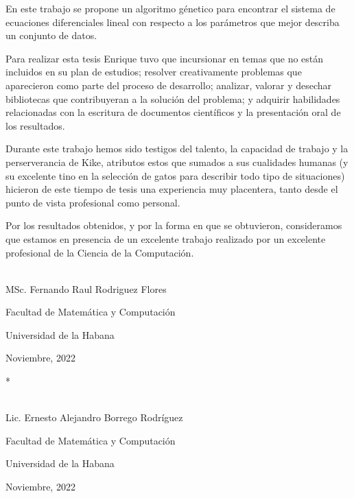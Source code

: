 \begin{opinion}
    En este trabajo se propone un algoritmo génetico para encontrar el sistema de ecuaciones diferenciales lineal con respecto a los parámetros que mejor describa un conjunto de datos.

    Para realizar esta tesis Enrique tuvo que incursionar en temas que no están incluidos en su plan de estudios; resolver creativamente problemas que aparecieron como parte del proceso de desarrollo; analizar, valorar y desechar bibliotecas que contribuyeran a la solución del problema; y adquirir habilidades relacionadas con la escritura de documentos científicos y la presentación oral de los resultados.

    Durante este trabajo hemos sido testigos del talento, la capacidad de trabajo y la perserverancia de Kike, atributos estos que sumados a sus cualidades humanas (y su excelente tino en la selección de gatos para describir todo tipo de situaciones) hicieron de este tiempo de tesis una experiencia muy placentera, tanto desde el punto de vista profesional como personal.

    Por los resultados obtenidos, y por la forma en que se obtuvieron,  consideramos que estamos en presencia de un excelente trabajo realizado por un excelente profesional de la Ciencia de la Computación.



    \begin{flushright}
        \underline{\hspace{6.5cm}}\\
        MSc. Fernando Raul Rodriguez Flores

        Facultad de Matemática y Computación

        Universidad de la Habana

        Noviembre, 2022
    \end{flushright}*

    \begin{flushright}
        \underline{\hspace{6.5cm}}\\
        Lic. Ernesto Alejandro Borrego Rodríguez

        Facultad de Matemática y Computación

        Universidad de la Habana

        Noviembre, 2022
    \end{flushright}

\end{opinion}

